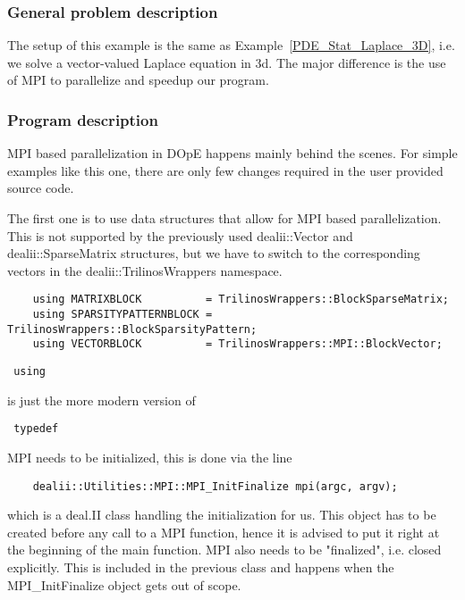 \subsubsection{General problem description}
The setup of this example is the same as Example~\ref{PDE_Stat_Laplace_3D}, i.e. we solve a vector-valued Laplace equation in 3d. The major difference is the use of MPI to parallelize and speedup our program.

\subsubsection{Program description}
MPI based parallelization in DOpE happens mainly behind the scenes. For simple examples like this one, there are only few changes required in the user provided source code.

The first one is to use data structures that allow for MPI based parallelization. This is not supported by the previously used dealii::Vector and dealii::SparseMatrix structures, but we have to switch to the corresponding vectors in the dealii::TrilinosWrappers namespace.

\begin{verbatim}
	using MATRIXBLOCK          = TrilinosWrappers::BlockSparseMatrix;
	using SPARSITYPATTERNBLOCK = TrilinosWrappers::BlockSparsityPattern;
	using VECTORBLOCK          = TrilinosWrappers::MPI::BlockVector;
\end{verbatim}

\begin{remark}
	\begin{verbatim} using \end{verbatim} is just the more modern version of \begin{verbatim} typedef \end{verbatim}
\end{remark}

MPI needs to be initialized, this is done via the line 
\begin{verbatim}
	dealii::Utilities::MPI::MPI_InitFinalize mpi(argc, argv);
\end{verbatim}
which is a deal.II class handling the initialization for us. This object has to be created before any call to a MPI function, hence it is advised to put it right at the beginning of the main function. MPI also needs to be "finalized", i.e. closed explicitly. This is included in the previous class and happens when the MPI\_InitFinalize object gets out of scope.


